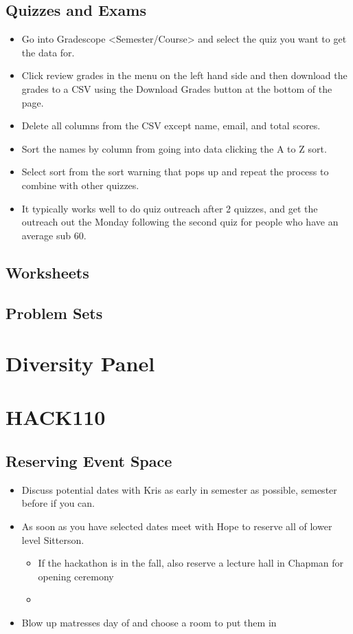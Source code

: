 \documentclass[a4paper]{article}
\begin{document}
\subsection{\label{quiz_outreach}Quizzes and Exams}
\begin{itemize}
\item Go into Gradescope <Semester/Course> and select the quiz you want to get the data for.
\item Click review grades in the menu on the left hand side and then download the grades to a CSV using the Download Grades button at the bottom of the page. 
\item Delete all columns from the CSV except name, email, and total scores. 
\item Sort the names by column from going into data clicking the A to Z sort. 
\item Select sort from the sort warning that pops up and repeat the process to combine with other quizzes. 
\item It typically works well to do quiz outreach after 2 quizzes, and get the outreach out the Monday following the second quiz for people who have an average sub 60. 
\end{itemize}
\subsection{Worksheets}
\subsection{Problem Sets}
\section{Diversity Panel}
\section{\label{hackathon}HACK110}
\subsection{Reserving Event Space}
\begin{itemize}
\item Discuss potential dates with Kris as early in semester as possible, semester before if you can. 
\item As soon as you have selected dates meet with Hope to reserve all of lower level Sitterson. 
\begin{itemize}
\item If the hackathon is in the fall, also reserve a lecture hall in Chapman for opening ceremony 
\item 
\end{itemize}
\item Blow up matresses day of and choose a room to put them in 
\end{itemize}
\end{document}
